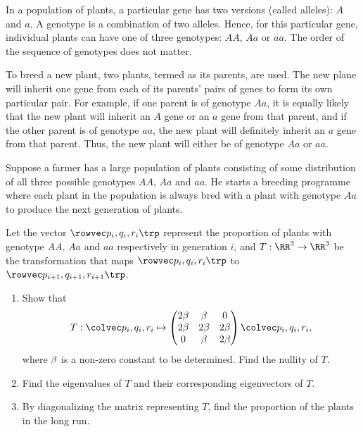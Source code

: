 \begin{problem}
    In a population of plants, a particular gene has two versions (called alleles): $A$ and $a$. A genotype is a combination of two alleles. Hence, for this particular gene, individual plants can have one of three genotypes: $AA$, $Aa$ or $aa$. The order of the sequence of genotypes does not matter.

    To breed a new plant, two plants, termed as its parents, are used. The new plane will inherit one gene from each of its parents' pairs of genes to form its own particular pair. For example, if one parent is of genotype $Aa$, it is equally likely that the new plant will inherit an $A$ gene or an $a$ gene from that parent, and if the other parent is of genotype $aa$, the new plant will definitely inherit an $a$ gene from that parent. Thus, the new plant will either be of genotype $Aa$ or $aa$.

    Suppose a farmer has a large population of plants consisting of some distribution of all three possible genotypes $AA$, $Aa$ and $aa$. He starts a breeding programme where each plant in the population is always bred with a plant with genotype $Aa$ to produce the next generation of plants.

    Let the vector $\cveciiix{p_i}{q_i}{r_i}$ represent the proportion of plants with genotype $AA$, $Aa$ and $aa$ respectively in generation $i$, and $T : \RR^3 \to \RR^3$ be the transformation that maps $\cveciiix{p_i}{q_i}{r_i}$ to $\cveciiix{p_{i+1}}{q_{i+1}}{r_{i+1}}$.

    \begin{enumerate}
        \item Show that \[T: \cveciii{p_i}{q_i}{r_i} \mapsto \begin{pmatrix}2\b & \b & 0 \\ 2\b & 2\b & 2\b \\ 0 & \b & 2\b\end{pmatrix} \cveciii{p_i}{q_i}{r_i},\] where $\beta$ is a non-zero constant to be determined. Find the nullity of $T$.
        \item Find the eigenvalues of $T$ and their corresponding eigenvectors of $T$.
        \item By diagonalizing the matrix representing $T$, find the proportion of the plants in the long run.
    \end{enumerate}
\end{problem}
